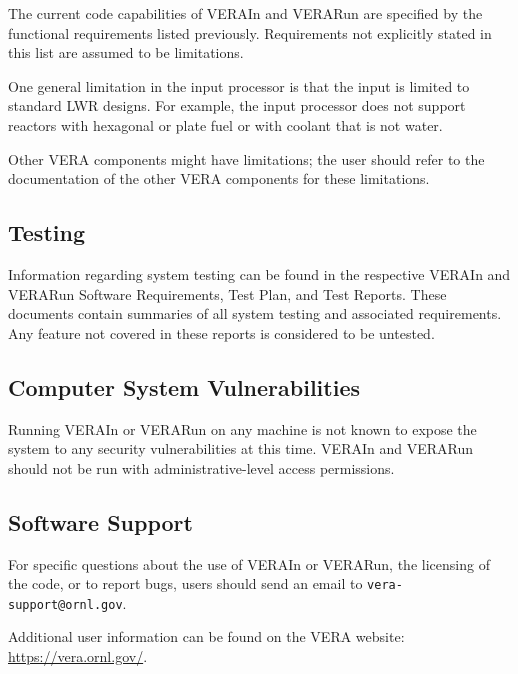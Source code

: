 The current code capabilities of VERAIn and VERARun are specified by the functional requirements listed previously.
Requirements not explicitly stated in this list are assumed to be limitations.

One general limitation in the input processor is that the input is limited to standard LWR designs.
For example, the input processor does not support reactors with hexagonal or plate fuel or with coolant
that is not water.

Other VERA components might have limitations; the user should refer to the documentation
of the other VERA components for these limitations.

\subsection{Testing}

Information regarding system testing can be found in the respective VERAIn and VERARun Software Requirements, Test Plan,
and Test Reports. These documents contain summaries of all system testing and associated requirements.
Any feature not covered in these reports is considered to be untested.

\subsection{Computer System Vulnerabilities}

Running VERAIn or VERARun on any machine is not known to expose the system to any security
vulnerabilities at this time.
VERAIn and VERARun should not be run with administrative-level access permissions.

\subsection{Software Support}

For specific questions about the use of VERAIn or VERARun, the licensing of the code, or to report bugs,
users should send an email to {\tt vera-support@ornl.gov}.

Additional user information can be found on the VERA website: \href{https://vera.ornl.gov/}{https://vera.ornl.gov/}.
